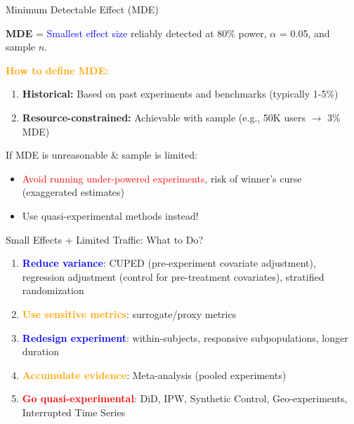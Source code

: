 \documentclass{beamer}
\newcommand{\blue}[1]{\textcolor{blue}{#1}}
\newcommand{\red}[1]{\textcolor{red}{#1}}
\newcommand{\orange}[1]{\textcolor{orange}{#1}}
\begin{document}
\begin{frame}{Minimum Detectable Effect (MDE) }

\textbf{MDE} = \blue{Smallest effect size} reliably detected at 80\% power, $\alpha$ = 0.05, and sample $n$.

\vspace{0.05cm}
\textbf{\orange{How to define MDE:}}
\begin{enumerate}
 \vspace{0.1cm}
    \item \textbf{Historical:} Based on past experiments and benchmarks (typically 1-5\%)
    \item \textbf{Resource-constrained:} Achievable with sample (e.g., 50K users $\rightarrow$ 3\% MDE)
\end{enumerate}

\vspace{0.1cm}
\begin{alertblock}{If MDE is unreasonable \& sample is limited:}
\vspace{0.2cm}
\begin{itemize}
    \item \red{Avoid running under-powered experiments}, risk of winner's curse (exaggerated estimates)
    \item Use quasi-experimental methods instead!
\end{itemize}
\end{alertblock}

\end{frame}

\begin{frame}{Small Effects + Limited Traffic: What to Do? }

\begin{enumerate}
    \item \textbf{\blue{Reduce variance}}: CUPED (pre-experiment covariate adjustment), regression adjustment (control for pre-treatment covariates), stratified randomization
    \item \textbf{\orange{Use sensitive metrics}}: surrogate/proxy metrics
    \item \textbf{\blue{Redesign experiment}}: within-subjects, responsive subpopulations, longer duration
    \item \textbf{\orange{Accumulate evidence}}: Meta-analysis (pooled experiments)
    \item \textbf{\red{Go quasi-experimental}}: DiD, IPW, Synthetic Control, Geo-experiments, Interrupted Time Series
\end{enumerate}

\end{frame}
\end{document}
